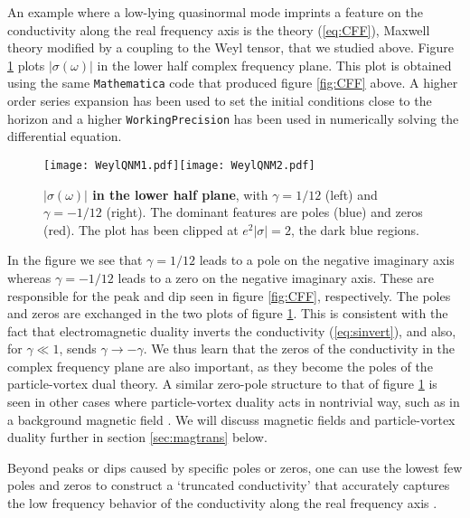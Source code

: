 \documentclass[10pt, oneside]{book}
\begin{document}
\begin{doublespace}
An example where a low-lying quasinormal mode imprints a feature on the conductivity along the real frequency axis is the theory (\ref{eq:CFF}), Maxwell theory modified by a coupling to the Weyl tensor, that we studied above. Figure \ref{fig:WeylQNM} plots $|\sigma(\omega)|$ in the lower half complex frequency plane. This plot is obtained using the same \texttt{Mathematica} code that produced figure \ref{fig:CFF} above. A higher order series expansion has been used to set the initial conditions close to the horizon and a higher \texttt{WorkingPrecision} has been used in numerically solving the differential equation.
\begin{figure}[h]
\centering
\texttt{[image: WeylQNM1.pdf]}\hspace{0.5cm}\texttt{[image: WeylQNM2.pdf]}
\caption{\label{fig:WeylQNM} {\bf $|\sigma(\omega)|$ in the lower half plane}, with $\gamma = 1/12$ (left) and $\gamma = -1/12$ (right). The dominant features are poles (blue) and zeros (red). The plot has been clipped at $e^2 |\sigma| = 2$, the dark blue regions.}
\end{figure}
In the figure we see that $\gamma = 1/12$ leads to a pole on the negative imaginary axis whereas $\gamma = - 1/12$ leads to a zero on the negative imaginary axis. These are responsible for the peak and dip seen in figure \ref{fig:CFF}, respectively. The poles and zeros are exchanged in the two plots of figure \ref{fig:WeylQNM}. This is consistent with the fact that electromagnetic duality inverts the conductivity (\ref{eq:sinvert}), and also, for $\gamma \ll 1$, sends $\gamma \to - \gamma$. We thus learn that the zeros of the conductivity in the complex frequency plane are also important, as they become the poles of the particle-vortex dual theory. A similar zero-pole structure to that of figure \ref{fig:WeylQNM} is seen in other cases where particle-vortex duality acts in nontrivial way, such as in a background magnetic field \cite{Hartnoll:2007ip}. We will discuss magnetic fields and particle-vortex duality further in section \ref{sec:magtrans} below.

Beyond peaks or dips caused by specific poles or zeros, one can use the lowest few poles and zeros to construct a `truncated conductivity' that accurately captures the low frequency behavior of the conductivity along the real frequency axis \cite{WitczakKrempa:2012gn}.


\end{doublespace}
\end{document}
